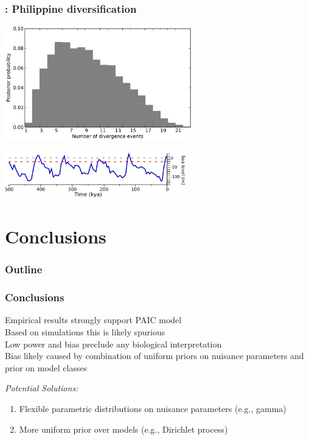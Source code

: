 \begin{frame}
    \frametitle{\dppmsbayes: Philippine diversification}
    \centerline{
    \includegraphics[height=5cm]{../empirical-analyses/plots/philippines-dpp-psi-posterior.pdf}}
    \smallskip
    \centerline{
    \includegraphics[height=2cm]{images/sea-level-only.pdf}}
\end{frame}

\section{Conclusions}

\begin{frame}
\frametitle{Outline}
\end{frame}

\begin{frame}
    \frametitle{Conclusions}
    Empirical results strongly support PAIC model \\
    \bigskip
    Based on simulations this is likely spurious \\
    \bigskip
    Low power and bias preclude any biological interpretation \\
    \bigskip
    Bias likely caused by combination of uniform priors on nuisance parameters
    and prior on model classes \\
    \bigskip
    \begin{block}{\it Potential Solutions:}
        \begin{enumerate}
            \item Flexible parametric distributions on nuisance parameters (e.g., gamma)
            \item More uniform prior over models (e.g., Dirichlet process)
        \end{enumerate}
    \end{block}
\end{frame}

